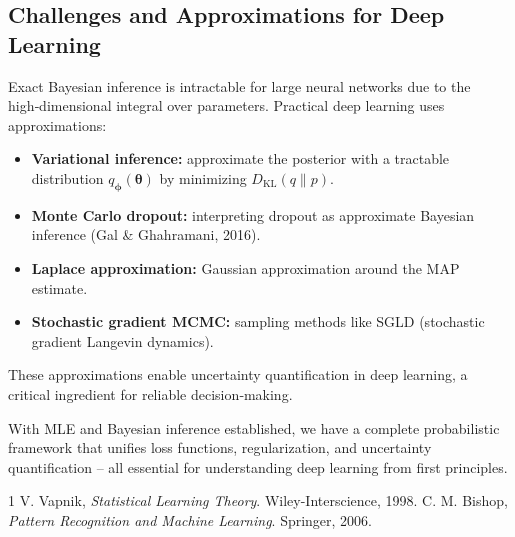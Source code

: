 \documentclass{tufte-handout}
\begin{document}
\subsection{Challenges and Approximations for Deep Learning}

Exact Bayesian inference is intractable for large neural networks due to the high‑dimensional integral over parameters. Practical deep learning uses approximations:
\begin{itemize}
    \item \textbf{Variational inference:} approximate the posterior with a tractable distribution $q_{\boldsymbol{\phi}}(\boldsymbol{\theta})$ by minimizing $D_{\text{KL}}(q \parallel p)$.
    \item \textbf{Monte Carlo dropout:} interpreting dropout as approximate Bayesian inference (Gal \& Ghahramani, 2016).
    \item \textbf{Laplace approximation:} Gaussian approximation around the MAP estimate.
    \item \textbf{Stochastic gradient MCMC:} sampling methods like SGLD (stochastic gradient Langevin dynamics).
\end{itemize}

These approximations enable uncertainty quantification in deep learning, a critical ingredient for reliable decision‑making.

\begin{marginfigure}
\centering
{}
\caption{Laplace approximation: a Gaussian centered at the MAP estimate.}
\end{marginfigure}

With MLE and Bayesian inference established, we have a complete probabilistic framework that unifies loss functions, regularization, and uncertainty quantification – all essential for understanding deep learning from first principles.



\begin{thebibliography}{1}
 V. Vapnik, \textit{Statistical Learning Theory}. Wiley-Interscience, 1998.
 C. M. Bishop, \textit{Pattern Recognition and Machine Learning}. Springer, 2006.
\end{thebibliography}
\end{document}
